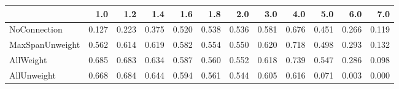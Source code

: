 \begin{tabular}{lrrrrrrrrrrr}
\toprule
{} &   1.0 &   1.2 &   1.4 &   1.6 &   1.8 &   2.0 &   3.0 &   4.0 &   5.0 &   6.0 &   7.0 \\
\midrule
NoConnection    & 0.127 & 0.223 & 0.375 & 0.520 & 0.538 & 0.536 & 0.581 & 0.676 & 0.451 & 0.266 & 0.119 \\
MaxSpanUnweight & 0.562 & 0.614 & 0.619 & 0.582 & 0.554 & 0.550 & 0.620 & 0.718 & 0.498 & 0.293 & 0.132 \\
AllWeight       & 0.685 & 0.683 & 0.634 & 0.587 & 0.560 & 0.552 & 0.618 & 0.739 & 0.547 & 0.286 & 0.098 \\
AllUnweight     & 0.668 & 0.684 & 0.644 & 0.594 & 0.561 & 0.544 & 0.605 & 0.616 & 0.071 & 0.003 & 0.000 \\
\bottomrule
\end{tabular}
